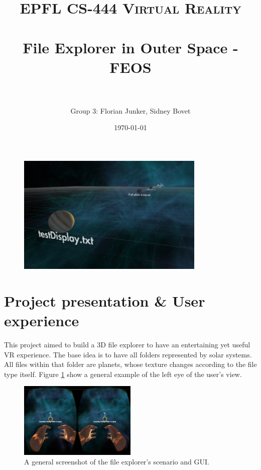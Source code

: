 \documentclass[paper=a4, fontsize=11pt]{scrartcl} %
\title{
	\normalfont \normalsize
	\textsc{EPFL CS-444 Virtual Reality} \\ [25pt] %
	\horrule{0.5pt} \\[0.4cm] %
	\huge File Explorer in Outer Space - FEOS \\ %
	\horrule{2pt} \\[0.5cm] %
}
\author{Group 3: Florian Junker, Sidney Bovet} %
\date{\normalsize\today} %
\numberwithin{equation}{section} %
\numberwithin{figure}{section} %
\numberwithin{table}{section} %
\begin{document}
\maketitle %


\begin{figure}[H]
	\centering
	\includegraphics[width=0.8\textwidth]{cover}
\end{figure}



\section{Project presentation \& User experience}


This project aimed to build a 3D file explorer to have an entertaining yet useful VR experience. The base idea is to have all folders represented by solar systems. All files within that folder are planets, whose texture changes according to the file type itself. Figure \ref{fig:general} show a general example of the left eye of the user's view.

\begin{figure}[H]
	\centering
	\includegraphics[width=0.5\textwidth]{base-idea}
	\caption{A general screenshot of the file explorer's scenario and GUI.}
	\label{fig:general}
\end{figure}
\end{document}
